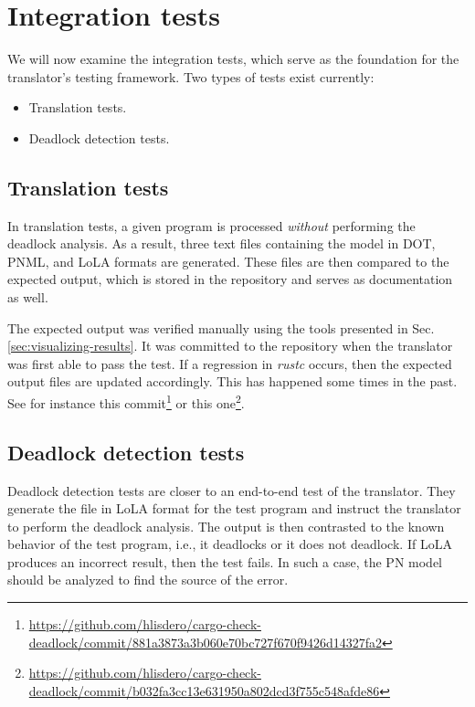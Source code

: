 \section{Integration tests}
\label{sec:integration-tests}

We will now examine the integration tests,
which serve as the foundation for the translator's testing framework.
Two types of tests exist currently:

\begin{itemize}
  \item Translation tests.
  \item Deadlock detection tests.
\end{itemize}

\subsection{Translation tests}

In translation tests, a given program is processed
\emph{without} performing the deadlock analysis.
As a result, three text files containing the model
in DOT, \acrshort{PNML}, and \acrshort{LoLA} formats are generated.
These files are then compared to the expected output,
which is stored in the repository and serves as documentation as well.

The expected output was verified manually
using the tools presented in Sec. \ref{sec:visualizing-results}.
It was committed to the repository
when the translator was first able to pass the test.
If a regression in \emph{rustc} occurs,
then the expected output files are updated accordingly.
This has happened some times in the past.
See for instance
this commit\footnote{\url{https://github.com/hlisdero/cargo-check-deadlock/commit/881a3873a3b060e70bc727f670f9426d14327fa2}}
or this one\footnote{\url{https://github.com/hlisdero/cargo-check-deadlock/commit/b032fa3cc13e631950a802dcd3f755c548afde86}}.

\subsection{Deadlock detection tests}

Deadlock detection tests are closer to an end-to-end test of the translator.
They generate the file in \acrshort{LoLA} format for the test program
and instruct the translator to perform the deadlock analysis.
The output is then contrasted to the known behavior of the test program, i.e.,
it deadlocks or it does not deadlock.
If \acrshort{LoLA} produces an incorrect result, then the test fails.
In such a case, the \acrshort{PN} model should be analyzed
to find the source of the error.

